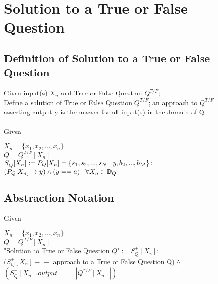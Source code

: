 \documentclass[11pt]{article}
\begin{document}
\newpage

\section*{Solution to a True or False Question}
\subsection{Definition of Solution to a True or False Question}
Given input(s) $X_n$ and True or False Question $Q^{T/F}$;\\
Define a solution of True or False Question $Q^{T/F}$; an approach to $Q^{T/F}$\\
asserting output y is the answer for all input(s) in the domain of Q\\
\\
Given
\begin{center}
$
X_n = \{x_1,x_2,...,x_n\}
$
\\ \vspace{2mm}
$
Q = Q^{T/F}[X_n]
$
\\ \vspace{6mm}
$
S^+_{Q}[X_n] := P_{Q}[X_n] =\{ s_1,s_2,...,s_{N}\hspace{1mm}|\hspace{1mm} y, b_2,...,b_M\} :
$
\\ \vspace{2mm}
$
(P_{Q}[X_n] \rightarrow y) \land (y == a) \hspace{3mm} \forall  X_n \in \mathbb{D}_Q
$
\end{center}


\subsection{Abstraction Notation}
Given
\begin{center}
$
X_n = \{x_1,x_2,...,x_n\}
$
\\ \vspace{2mm}
$
Q = Q^{T/F}[X_n]
$
\\ \vspace{6mm}
"Solution to True or False Question $Q$"$ := S^+_{Q}[X_n] :
$
\\ \vspace{2mm}
$
(S^+_{Q}[X_n] \equiv \equiv$ approach to a True or False Question Q$)\land
$
\\ \vspace{2mm}
$
(S^+_{Q}[X_n].output == |Q^{T/F}[X_n]|)
$
\end{center}
\end{document}
